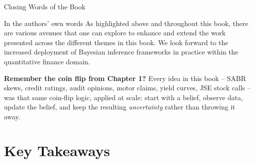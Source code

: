 \documentclass[aspectratio=169,10pt]{beamer}
\begin{document}
\begin{frame}{Closing Words of the Book}
  \begin{block}{In the authors' own words}
    As highlighted above and throughout this book, there are various
    avenues that one can explore to enhance and extend the work presented
    across the different themes in this book. We look forward to the
    increased deployment of Bayesian inference frameworks in practice
    within the quantitative finance domain.
  \end{block}
  \textbf{Remember the coin flip from Chapter 1?} Every idea in this
  book -- SABR skews, credit ratings, audit opinions, motor claims,
  yield curves, JSE stock calls -- was that same coin-flip logic, applied
  at scale: start with a belief, observe data, update the belief, and
  keep the resulting \emph{uncertainty} rather than throwing it away.
\end{frame}

\section{Key Takeaways}
\end{document}
